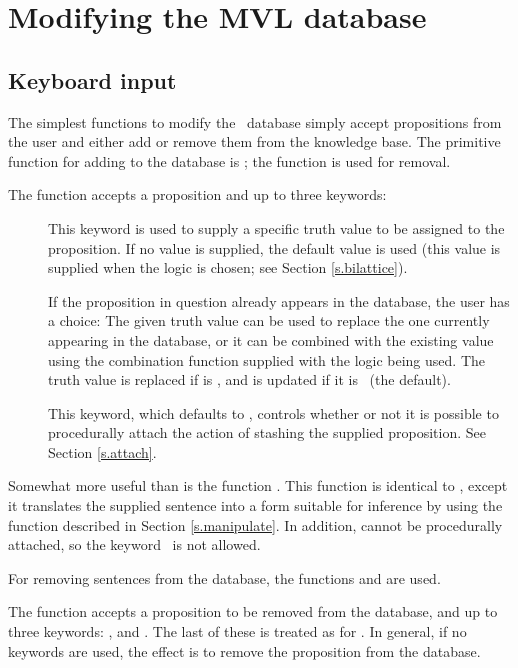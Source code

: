 \section{Modifying the MVL database}

\subsection{Keyboard input}

The simplest functions to modify the \mvl\ database simply accept
propositions from the user and either add or remove them from the
knowledge base.  The primitive function for adding to the database is
; the function  is used for removal.

The function  accepts a proposition and up to three
keywords:
 \begin{description}
 \item []  This keyword is used to supply a specific truth
value to be assigned to the proposition.  If no value is supplied, the
default value is used (this value is supplied when the logic is chosen;
see Section \ref{s.bilattice}).
 \item [] If the proposition in question already
appears in the database, the user has a choice: The given truth value
can be used to replace the one currently appearing in the database,
or it can be combined with the existing value using the combination
function supplied with the logic being used.  The truth value is
replaced if  is \NIL, and is updated if it is \T\
(the default).
 \item [\apa{}] This keyword,
which defaults to \T, controls whether or not it is possible to
procedurally attach the action of stashing the supplied proposition.
See Section \ref{s.attach}.
 \end{description}

Somewhat more useful than  is the function .
This function is identical to \type{stash}, except it translates the
supplied sentence into a form suitable for inference by using the
function \itype{normal-form} described in Section \ref{s.manipulate}.
In addition, \type{state} cannot be procedurally attached, so the
keyword \apa\ is not allowed.

For removing sentences from the database, the functions 
and \itype{unstate} are used.

The function  accepts a proposition to be removed from
the database, and up to three keywords: \type{value},
 and \apa.  The last of these is treated as for
\type{stash}.  In general, if no keywords are used, the effect is to
remove the proposition from the database.

